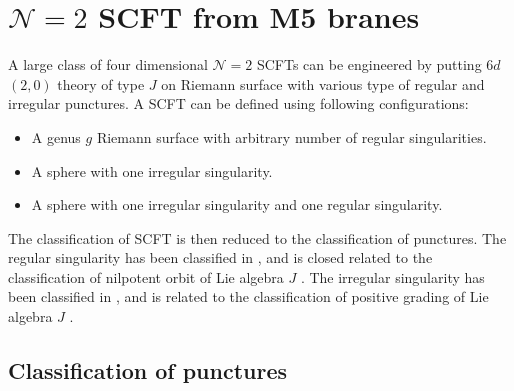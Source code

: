 \documentclass[a4paper,11pt]{article}
\begin{document}
\section{$\mathcal{N}=2$ SCFT from M5 branes}
A large class of four dimensional $\mathcal{N}=2$ SCFTs can be engineered by putting $6d$ $(2,0)$ theory of type $J$ on Riemann surface with various type of regular and irregular punctures. 
 A SCFT can be defined  using following configurations:
\begin{itemize}
\item A genus $g$ Riemann surface with arbitrary number of regular singularities.
\item A sphere with one irregular singularity.
\item A sphere with one irregular singularity and one regular singularity.
\end{itemize}
The classification of  SCFT is then  reduced to the classification of punctures. The regular singularity has been classified in \cite{Gaiotto:2009we,Nanopoulos:2009uw,Chacaltana:2012zy}, and is closed related to the classification of nilpotent orbit of Lie algebra $J$ \cite{collingwood1993nilpotent}. The irregular singularity has been classified in \cite{Xie:2012hs,Wang:2015mra}, and is related to the classification of positive grading of Lie algebra $J$ \cite{reeder2012gradings}. 


\subsection{Classification of punctures }
\end{document}
